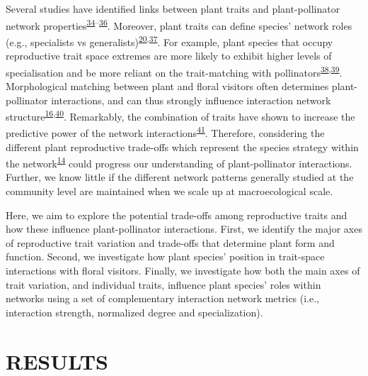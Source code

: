 \documentclass[12pt,a4paper,]{article}
\begin{document}
Several studies have identified links between plant traits and
plant-pollinator network
properties\textsuperscript{\protect\hyperlink{ref-bartomeus2013}{34}--\protect\hyperlink{ref-rowe2020}{36}}.
Moreover, plant traits can define species' network roles (e.g.,
specialists vs
generalists)\textsuperscript{\protect\hyperlink{ref-tur2013}{20},\protect\hyperlink{ref-lazaro2013}{37}}.
For example, plant species that occupy reproductive trait space extremes
are more likely to exhibit higher levels of specialisation and be more
reliant on the trait-matching with
pollinators\textsuperscript{\protect\hyperlink{ref-junker2013}{38},\protect\hyperlink{ref-coux2016}{39}}.
Morphological matching between plant and floral visitors often
determines plant-pollinator interactions, and can thus strongly
influence interaction network
structure\textsuperscript{\protect\hyperlink{ref-stang2009}{16},\protect\hyperlink{ref-ibanez2012}{40}}.
Remarkably, the combination of traits have shown to increase the
predictive power of the network
interactions\textsuperscript{\protect\hyperlink{ref-eklof2013}{41}}.
Therefore, considering the different plant reproductive trade-offs which
represent the species strategy within the
network\textsuperscript{\protect\hyperlink{ref-dehling2016}{14}} could
progress our understanding of plant-pollinator interactions. Further, we
know little if the different network patterns generally studied at the
community level are maintained when we scale up at macroecological
scale.

Here, we aim to explore the potential trade-offs among reproductive
traits and how these influence plant-pollinator interactions. First, we
identify the major axes of reproductive trait variation and trade-offs
that determine plant form and function. Second, we investigate how plant
species' position in trait-space interactions with floral visitors.
Finally, we investigate how both the main axes of trait variation, and
individual traits, influence plant species' roles within networks using
a set of complementary interaction network metrics (i.e., interaction
strength, normalized degree and specialization).

\section{RESULTS}\label{results}
\end{document}
